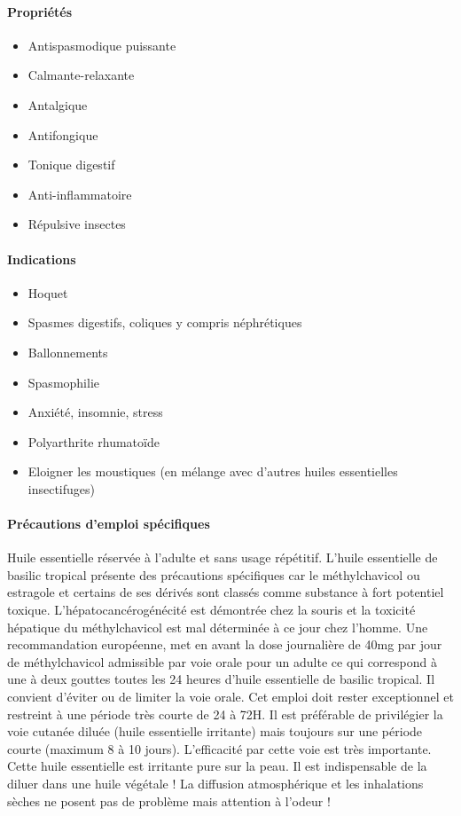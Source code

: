 \documentclass[12pt,a4wide]{article}
\begin{document}
\paragraph{Propriétés}
\label{sec-4-4-1-2}

\begin{itemize}
\item Antispasmodique puissante
\item Calmante-relaxante
\item Antalgique
\item Antifongique
\item Tonique digestif
\item Anti-inflammatoire
\item Répulsive insectes
\end{itemize}

\paragraph{Indications}
\label{sec-4-4-1-3}
\begin{itemize}
\item Hoquet
\item Spasmes digestifs, coliques y compris néphrétiques
\item Ballonnements
\item Spasmophilie
\item Anxiété, insomnie, stress
\item Polyarthrite rhumatoïde
\item Eloigner les moustiques (en mélange avec d'autres huiles essentielles insectifuges)
\end{itemize}

\paragraph{Précautions d'emploi spécifiques}
\label{sec-4-4-1-4}
Huile  essentielle  réservée  à  l'adulte  et  sans  usage  répétitif.   L'huile
essentielle  de basilic  tropical présente  des précautions  spécifiques car  le
méthylchavicol  ou estragole  et  certains  de ses  dérivés  sont classés  comme
substance à fort potentiel toxique.  L'hépatocancérogénécité est démontrée chez  la souris et
la  toxicité hépatique  du  méthylchavicol est  mal déterminée  à  ce jour  chez
l'homme.  Une  recommandation européenne,  met en avant  la dose  journalière de
40mg par jour de méthylchavicol admissible par  voie orale pour un adulte ce qui
correspond à  une à  deux gouttes  toutes les 24  heures d'huile  essentielle de
basilic tropical.  Il convient d'éviter ou  de limiter la voie orale. Cet emploi
doit rester exceptionnel et restreint à une période très courte de 24 à 72H.  Il
est  préférable  de  privilégier  la  voie  cutanée  diluée  (huile  essentielle
irritante)   mais  toujours   sur   une   période  courte   (maximum   8  à   10
jours).  L'efficacité  par   cette  voie  est  très   importante.   Cette  huile
essentielle est  irritante pure sur la  peau. Il est indispensable  de la diluer
dans une huile végétale !  La  diffusion atmosphérique et les inhalations sèches
ne  posent pas  de problème  mais attention  à l'odeur  ! 
\end{document}
